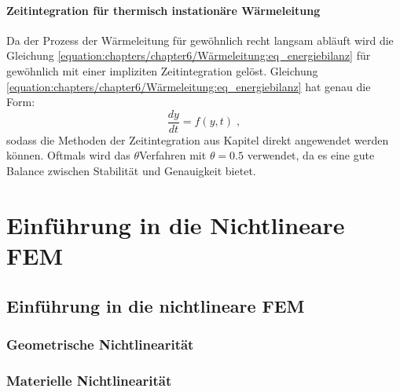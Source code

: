 \documentclass[letterpaper,10pt,german]{jupyterBook}
\begin{document}
\subsection{Zeitintegration für thermisch instationäre Wärmeleitung}
\label{\detokenize{chapters/chapter6/W_xe4rmeleitung:zeitintegration-fur-thermisch-instationare-warmeleitung}}
\sphinxAtStartPar
Da der Prozess der Wärmeleitung für gewöhnlich recht langsam abläuft wird die Gleichung \eqref{equation:chapters/chapter6/Wärmeleitung:eq_energiebilanz} für gewöhnlich mit einer impliziten Zeitintegration gelöst. Gleichung \eqref{equation:chapters/chapter6/Wärmeleitung:eq_energiebilanz} hat genau die Form:
\begin{equation*}
 \frac{dy}{dt} = f(y, t) \; ,
\end{equation*}
\sphinxAtStartPar
sodass die Methoden der Zeitintegration aus Kapitel {\hyperref[\detokenize{chapters/chapter6/TransienteDynamik:implizite-zeitintegration}]{}} direkt angewendet werden können. Oftmals wird das \(\theta\)\sphinxhyphen{}Verfahren mit \(\theta = 0.5\) verwendet, da es eine gute Balance zwischen Stabilität und Genauigkeit bietet.

\sphinxstepscope


\part{Einführung in die Nichtlineare FEM}

\sphinxstepscope


\chapter{Einführung in die nichtlineare FEM}
\label{\detokenize{chapters/chapter5/Overview:einfuhrung-in-die-nichtlineare-fem}}\label{\detokenize{chapters/chapter5/Overview::doc}}
\sphinxstepscope


\section{Geometrische Nichtlinearität}
\label{\detokenize{chapters/chapter5/GeometrischeNichtlinearit_xe4t:geometrische-nichtlinearitat}}\label{\detokenize{chapters/chapter5/GeometrischeNichtlinearit_xe4t::doc}}
\sphinxstepscope


\section{Materielle Nichtlinearität}
\label{\detokenize{chapters/chapter5/MaterielleNichtlinearit_xe4t:materielle-nichtlinearitat}}\label{\detokenize{chapters/chapter5/MaterielleNichtlinearit_xe4t::doc}}
\sphinxstepscope
\end{document}
